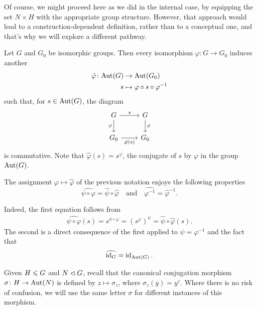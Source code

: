 Of course, we might proceed here as we did in the internal case, by equipping the set $N\times H$ with the appropriate group structure. However, that approach would lead to a construction-dependent definition, rather than to a conceptual one, and that's why we will explore a different pathway.

\begin{ntn}
    Let\/ $G$ and\/ $G_0$ be isomorphic groups. Then every isomorphism\/ $\varphi\colon G\to G_0$ induces another
    \begin{align*}
        \hat\varphi\colon{\rm Aut}(G)&\to{\rm Aut}(G_0)\\
        s&\mapsto \varphi\circ s\circ\varphi^{-1}
    \end{align*}
    such that, for $s\in{\rm Aut}(G)$, the diagram
    $$
        \begin{tikzcd}
            G\arrow[r,"s"]\arrow[d, "\varphi"']
            &G\arrow[d,"\varphi"]
                \\
            G_0\arrow[r,"\hat\varphi(s)"']
            &G_0
        \end{tikzcd}
    $$    
    is commutative. Note that\/ $\hat\varphi(s)=s^\varphi$, the conjugate of\/ $s$ by\/ $\varphi$ in the group\/ ${\rm Aut}(G)$.
\end{ntn}

\begin{rem}\label{functorial-hat}
    The assignment $\varphi\mapsto\hat\varphi$ of the previous notation enjoys the following properties
    $$
        \widehat{\psi\circ\varphi}=\hat\psi\circ\hat\varphi
        \quad\text{and}\quad
        \widehat{\varphi^{-1}}=\hat\varphi^{-1}.
    $$
\end{rem}
    {\small Indeed, the first equation follows from
    \begin{align*}
        \widehat{\psi\circ\varphi}(s)=s^{\psi\circ\varphi}=(s^\varphi)^\psi
            =\hat\psi\circ\hat\varphi(s).
    \end{align*}
    The second is a direct consequence of the first applied to $\psi=\varphi^{-1}$ and the fact that
    $$
        \widehat{\operatorname{id}_G}=\operatorname{id}_{{\rm Aut}(G)}.
    $$
    }

\medskip

Given $H\leqslant G$ and $N\lhd G$, recall that the canonical conjugation morphism $\sigma\colon H\to{\rm Aut}(N)$ is defined by $z\mapsto\sigma_z$, where $\sigma_z(y)=y^z$. Where there is no risk of confusion, we will use the same letter $\sigma$ for different instances of this morphism.

